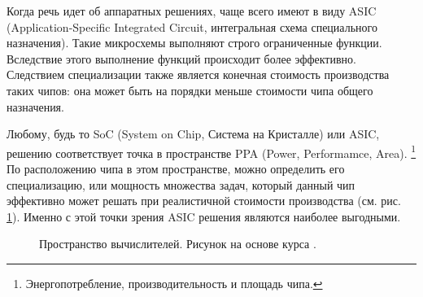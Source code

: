 \documentclass[a4paper,12pt]{article}
\begin{document}
Когда речь идет об аппаратных решениях, чаще всего имеют в виду ASIC (Application-Specific Integrated Circuit, интегральная схема специального назначения). Такие микросхемы выполняют строго ограниченные функции. Вследствие этого выполнение функций происходит более эффективно. Следствием специализации также является конечная стоимость производства таких чипов: она может быть на порядки меньше стоимости чипа общего назначения. 

Любому, будь то SoC (System on Chip, Система на Кристалле) или ASIC, решению соответствует точка в пространстве PPA (Power, Performamce, Area). \footnote{Энергопотребление, производительность и площадь чипа.} По расположению чипа в этом пространстве, можно определить его специализацию, или мощность множества задач, который данный чип эффективно может решать при реалистичной стоимости производства (см. рис. \ref{fig:asic-space}). Именно с этой точки зрения ASIC решения являются наиболее выгодными.

\begin{figure}[h]
	\centering
	
	\caption{Пространство вычислителей. Рисунок на основе курса \cite{DigitalASICDesign}.}
	\label{fig:asic-space}
\end{figure}
\end{document}
